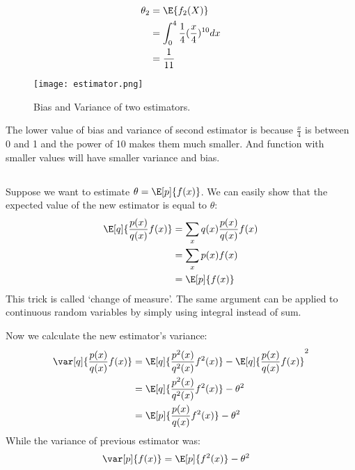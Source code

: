 \documentclass{article}
\begin{document}
\begin{align*}
\theta_2 &= \E{f_2(X)}\\
&= \int_{0}^{4} \frac{1}{4} (\frac{x}{4})^{10} dx\\
&= \frac{1}{11}
\end{align*}

\begin{figure}[H]
\centering
\texttt{[image: estimator.png]}
\caption{Bias and Variance of two estimators.}
\end{figure}

The lower value of bias and variance of second estimator is because \(\frac{x}{4}\) is between 0 and 1 and the power of 10 makes them much smaller.
And function with smaller values will have smaller variance and bias.

\subsection{}
Suppose we want to estimate \(\theta = \E[p]{f(x)}\).
We can easily show that the expected value of the new estimator is equal to \(\theta\):
\begin{align*}
\E[q]{\frac{p(x)}{q(x)} f(x)} &= \sum_{x} q(x) \frac{p(x)}{q(x)} f(x)\\
&= \sum_{x} p(x) f(x)\\
&= \E[p]{f(x)}
\end{align*}
This trick is called `change of measure'.
The same argument can be applied to continuous random variables by simply using integral instead of sum.

Now we calculate the new estimator's variance:
\begin{align*}
\var[q]{\frac{p(x)}{q(x)}f(x)} &= \E[q]{\frac{p^2(x)}{q^2(x)}f^2(x)} - \E[q]{\frac{p(x)}{q(x)}f(x)}^2\\
&= \E[q]{\frac{p^2(x)}{q^2(x)}f^2(x)} - \theta^2\\
&= \E[p]{\frac{p(x)}{q(x)}f^2(x)} - \theta^2
\end{align*}
While the variance of previous estimator was:
\begin{align*}
\var[p]{f(x)} &= \E[p]{f^2(x)} - \theta^2
\end{align*}
\end{document}
